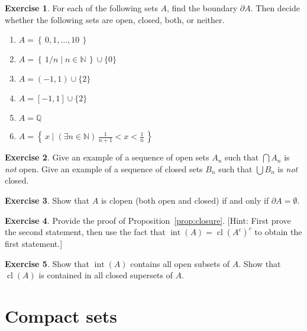 \documentclass[11pt,oneside]{amsbook}
\newcommand{\set}[1]{\left\{\,#1\,\right\}}
\newcommand{\NN}{\mathbb N}
\newcommand{\QQ}{\mathbb Q}
\DeclareMathOperator{\cl}{cl}
\DeclareMathOperator{\inte}{int}
\theoremstyle{definition}
\newtheorem{exerc}{Exercise}[section]
\theoremstyle{plain}
\theoremstyle{definition}
\theoremstyle{remark}
\numberwithin{equation}{section}
\numberwithin{figure}{section}
\begin{document}
\begin{exerc}
  For each of the following sets $A$, find the boundary $\partial A$. Then decide whether the following sets are open, closed, both, or neither.
  \begin{enumerate}
    \item $A=\set{0,1,\ldots,10}$
    \item $A=\set{1/n\mid n\in\NN}\cup\{0\}$
    \item $A=(-1,1)\cup\{2\}$
    \item $A=[-1,1]\cup\{2\}$
    \item $A=\QQ$
    \item $A=\set{x\mid (\exists n\in\NN)\,\frac1{n+1}<x<\frac1n}$
  \end{enumerate}
\end{exerc}

\begin{exerc}
  Give an example of a sequence of open sets $A_n$ such that $\bigcap A_n$ is \emph{not} open. Give an example of a sequence of closed sets $B_n$ such that $\bigcup B_n$ is \emph{not} closed.
\end{exerc}



\begin{exerc}
  Show that $A$ is clopen (both open and closed) if and only if $\partial A=\emptyset$.
\end{exerc}

\begin{exerc}
  Provide the proof of Proposition~\ref{prop:closure}. [Hint: First prove the second statement, then use the fact that $\inte(A)=\cl(A^c)^c$ to obtain the first statement.]
\end{exerc}

\begin{exerc}
  Show that $\inte(A)$ contains all open subsets of $A$. Show that $\cl(A)$ is contained in all closed supersets of $A$.
\end{exerc}


\newpage
\section{Compact sets}
\end{document}
